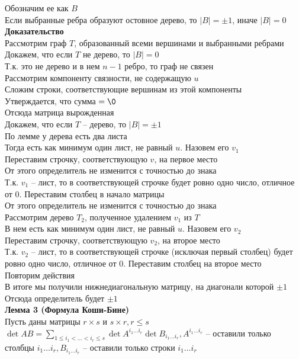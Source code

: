 \documentclass[12pt]{article}
\begin{document}
Обозначим ее как $B$\\
Если выбранные ребра образуют остовное дерево, то $|B| = \pm 1$, иначе $|B| = 0$\\
\textbf{Доказательство}\\
Рассмотрим граф $T$, образованный всеми вершинами и выбранными ребрами\\
Докажем, что если $T$ не дерево, то $|B| = 0$\\
Т.к. это не дерево и в нем $n-1$ ребро, то граф не связен\\
Рассмотрим компоненту связности, не содержащую $u$\\
Сложим строки, соответствующие вершинам из этой компоненты\\
Утверждается, что сумма $= \0$\\
Отсюда матрица вырожденная\\
Докажем, что если $T$ -- дерево, то $|B| = \pm 1$\\
По лемме у дерева есть два листа\\
Тогда есть как минимум один лист, не равный $u$. Назовем его $v_1$\\
Переставим строчку, соответствующую $v$, на первое место\\
От этого определитель не изменится с точностью до знака\\
Т.к. $v_1$ -- лист, то в соответствующей строчке будет ровно одно число, отличное от 0. Переставим столбец в начало матрицы\\
От этого определитель не изменится с точностью до знака\\
Рассмотрим дерево $T_2$, полученное удалением $v_1$ из $T$\\
В нем есть как минимум один лист, не равный $u$. Назовем его $v_2$\\
Переставим строчку, соответствующую $v_2$, на второе место\\
Т.к. $v_2$ -- лист, то в соответствующей строчке (исключая первый столбец) будет ровно одно число, отличное от 0. Переставим столбец на второе место\\
Повторим действия\\
В итоге мы получили нижнедиагональную матрицу, на диагонали которой $\pm 1$\\
Отсюда определитель будет $\pm 1$\\
\textbf{Лемма 3 (Формула Коши-Бине)}\\
Пусть даны матрицы $r\times s$ и $s \times r, r\leq s$\\
$\det AB = \sum_{1 \leq i_1 < \ldots < i_r \leq s} \det A^{i_1\ldots i_r}\det B_{i_1\ldots i_r}, A^{i_1\ldots i_r}$ -- оставили только столбцы $i_1\ldots i_r, B_{i_1\ldots i_r}$ -- оставили только строки $i_1\ldots i_r$\\\\
\end{document}
